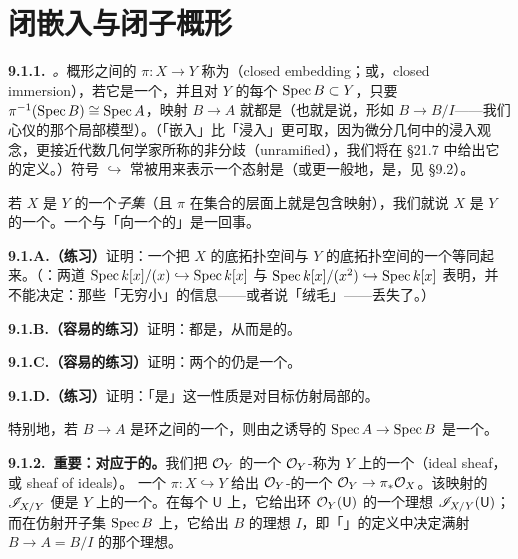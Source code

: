 
\section{闭嵌入与闭子概形}

\textbf{9.1.1.}\ \emph{\trhDefinition{}。}\quad 概形之间的\trMorphism{} $\pi\colon X\to Y$ 称为\textbf{\trClosedEmbedding}（closed embedding；或\textbf{\trClosedImmersion}，closed immersion），若它是一个\trAffine\trMorphism，并且对 $Y$ 的每个\trAffine\trOpenSubset{} $\operatorname{Spec} B\subset Y$，只要 $\pi^{-1}(\operatorname{Spec} B)\cong\operatorname{Spec} A$，映射 $B\to A$ 就都是\trSurjectiveMap{}（也就是说，形如 $B\to B/I$——我们心仪的那个局部模型）。（「嵌入」比「浸入」更可取，因为微分几何中的浸入观念，更接近代数几何学家所称的非分歧（unramified），我们将在 \S21.7 中给出它的定义。）符号 $\hookrightarrow$ 常被用来表示一个态射是\trClosedEmbedding{}（或更一般地，是\trLocally\trClosedEmbedding，见 \S9.2）。

若 $X$ 是 $Y$ 的一个\emph{子集}（且 $\pi$ 在集合的层面上就是包含映射），我们就说 $X$ 是 $Y$ 的一个\textbf{\trClosedSubscheme}。一个\trClosedEmbedding{}与「向一个\trClosedSubscheme{}的\trIsomorphism」是一回事。

\textbf{9.1.A.（练习）}\quad 证明：一个\trClosedEmbedding{}把 $X$ 的底拓扑空间与 $Y$ 的底拓扑空间的一个\trClosedSubset{}等同起来。（\trhCaveat{}：两道\trClosedEmbedding{} $\operatorname{Spec} k[x]/(x)\hookrightarrow\operatorname{Spec} k[x]$ 与 $\operatorname{Spec} k[x]/(x^2)\hookrightarrow\operatorname{Spec} k[x]$ 表明，\trClosedSubset{}并不能决定\trClosedSubscheme：那些「无穷小」的信息——或者说「绒毛」——丢失了。）

\textbf{9.1.B.（容易的练习）}\quad 证明：\trClosedEmbedding{}都是\trFinite\trMorphism，从而是\trFiniteType{}的。

\textbf{9.1.C.（容易的练习）}\quad 证明：两个\trClosedEmbedding{}的\trComposition{}仍是一个\trClosedEmbedding。

\textbf{9.1.D.（练习）}\quad 证明：「是\trClosedEmbedding」这一性质是对目标仿射局部的。

特别地，若 $B\to A$ 是环之间的一个\trSurjectiveMap，则由之诱导的\trMorphism{} $\operatorname{Spec} A\to\operatorname{Spec} B$ 是一个\trClosedEmbedding。

\textbf{9.1.2.\ 重要：\trClosedSubscheme{}对应于\trQC{}的\trIdealSheaf{}。}\quad 我们把 $\mathcal{O}_Y$ 的一个 $\mathcal{O}_Y$-\trSubmodule{}称为 $Y$ 上的一个\textbf{\trIdealSheaf{}}（ideal sheaf，或 sheaf of ideals）。%
一个\trClosedSubscheme{} $\pi\colon X\hookrightarrow Y$ 给出 $\mathcal{O}_Y$-\trModule{}的一个\trSurjectiveMap{} $\mathcal{O}_Y\to\pi_*\mathcal{O}_X$。该映射的\trKernel{} $\mathscr{I}_{X/Y}$ 便是 $Y$ 上的一个\trIdealSheaf{}。在每个\trOpenSubset{} $\mathsf{U}$ 上，它给出环 $\mathcal{O}_Y(\mathsf{U})$ 的一个理想 $\mathscr{I}_{X/Y}(\mathsf{U})$；而在仿射开子集 $\operatorname{Spec} B$ 上，它给出 $B$ 的理想 $I$，即「\trClosedSubscheme」的定义中决定满射 $B\to A=B/I$ 的那个理想。


